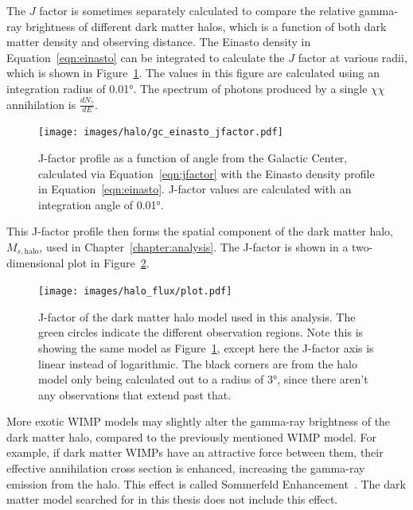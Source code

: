     The $J$ factor is sometimes separately calculated to compare the relative gamma-ray brightness of different dark matter halos, which is a function of both dark matter density and observing distance.
    The Einasto density in Equation~\ref{eqn:einasto} can be integrated to calculate the $J$ factor at various radii, which is shown in Figure~\ref{fig:gchalo_jfactor}.
    The values in this figure are calculated using an integration radius of \ang{0.01}.
    The spectrum of photons produced by a single $\chi\chi$ annihilation is $\frac{dN_{\gamma}}{dE}$.
    
    \begin{figure}[ht]
    \centering
      \texttt{[image: images/halo/gc\_einasto\_jfactor.pdf]}
      \caption[Galactic Center Einasto Halo Jfactor]{
        J-factor profile as a function of angle from the Galactic Center, calculated via Equation~\ref{eqn:jfactor} with the Einasto density profile in Equation~\ref{eqn:einasto}.
        J-factor values are calculated with an integration angle of \ang{0.01}.
      }
      \label{fig:gchalo_jfactor}
    \end{figure}
    
    This J-factor profile then forms the spatial component of the dark matter halo, $M_{s,\textrm{halo}}$, used in Chapter~\ref{chapter:analysis}.
    The J-factor is shown in a two-dimensional plot in Figure~\ref{fig:halojfactor}.
  
  \begin{figure}[ht]
    \centering
    \texttt{[image: images/halo\_flux/plot.pdf]}
    \caption[Galactic Center Halo J-factor Skymap]{
      J-factor of the dark matter halo model used in this analysis.
      The green circles indicate the different observation regions.
      Note this is showing the same model as Figure~\ref{fig:gchalo_jfactor}, except here the J-factor axis is linear instead of logarithmic.
      The black corners are from the halo model only being calculated out to a radius of \ang{3}, since there aren't any observations that extend past that.
    }
    \label{fig:halojfactor}
  \end{figure}

  More exotic WIMP models may slightly alter the gamma-ray brightness of the dark matter halo, compared to the previously mentioned WIMP model.
  For example, if dark matter WIMPs have an attractive force between them, their effective annihilation cross section is enhanced, increasing the gamma-ray emission from the halo.
  This effect is called Sommerfeld Enhancement~\cite{sommerfeld}.
  The dark matter model searched for in this thesis does not include this effect.
    
